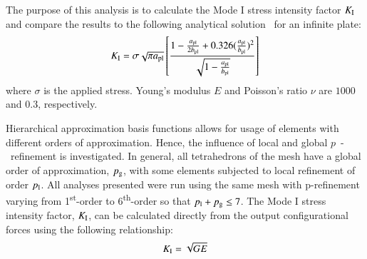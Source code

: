 \documentclass[review]{elsarticle}
\numberwithin{equation}{section}
\begin{document}
The purpose of this analysis is to calculate the Mode I stress intensity factor $ K_{\rm I} $ and compare the results to the following analytical solution~\citep{rooke1976compendium} for an infinite plate:
\begin{equation}\label{eq:frac_analytical}
K_{\rm I}=\sigma \sqrt{\pi a_{\rm {pl}}} \left[  \frac{1 - \frac{a_{\rm {pl}}}{2b_{\rm {pl}}} + 0.326 (\frac{a_{\rm {pl}}}{b_{\rm {pl}}})^2 }{\sqrt{1-\frac{a_{\rm {pl}}}{b_{\rm {pl}}}}}  \right]
\end{equation}
where $\sigma $ is the applied stress. 
Young's modulus $E$ and Poisson's ratio $\nu$ are $1000$ and $0.3$, respectively. 


Hierarchical approximation basis functions allows for usage of elements with different orders of approximation. 
Hence, the influence of local and global $p$~-~refinement is investigated.
In general, all tetrahedrons of the mesh have a global order of approximation, $p_{\rm g}$, with some elements subjected to local refinement of order $p_{\rm{l}}$.
All analyses presented were run using the same mesh with p-refinement varying from 1\textsuperscript{st}-order  to 6\textsuperscript{th}-order so that $p_{\rm l} + p_{\rm g} \leq 7$.
The Mode I stress intensity factor, $K_{\rm I}$, can be calculated directly from the output configurational forces using the following relationship: 
\begin{equation}
K_{\rm I} = \sqrt{GE}
\end{equation}
\end{document}
